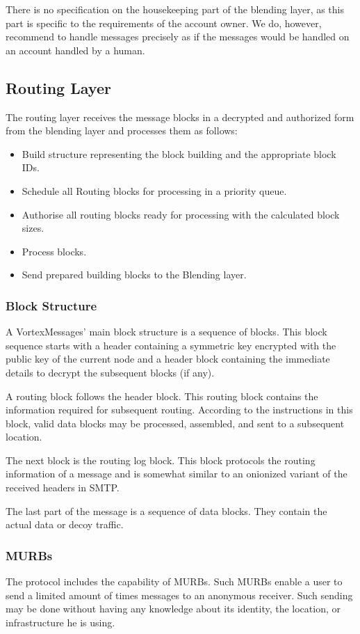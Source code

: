 There is no specification on the housekeeping part of the blending layer, as this part is specific to the requirements of the account owner. We do, however, recommend to handle messages precisely as if the messages would be handled on an account handled by a human. 

\subsection{Routing Layer}
The routing layer receives the message blocks in a decrypted and authorized form from the blending layer and processes them as follows:

\begin{itemize}
	\item Build structure representing the block building and the appropriate block IDs.
	\item Schedule all Routing blocks for processing in a priority queue.
	\item Authorise all routing blocks ready for processing with the calculated block sizes.
	\item Process blocks.
	\item Send prepared building blocks to the Blending layer.
\end{itemize}

\subsubsection{Block Structure}
A VortexMessages' main block structure is a sequence of blocks. This block sequence starts with a header containing a symmetric key encrypted with the public key of the current node and a header block containing the immediate details to decrypt the subsequent blocks (if any).

A routing block follows the header block. This routing block contains the information required for subsequent routing. According to the instructions in this block, valid data blocks may be processed, assembled, and sent to a subsequent location. 

The next block is the routing log block. This block protocols the routing information of a message and is somewhat similar to an onionized variant of the received headers in SMTP.

The last part of the message is a sequence of data blocks. They contain the actual data or decoy traffic.

\subsubsection{MURBs\label{sec:murb}}
The protocol includes the capability of MURBs. Such MURBs enable a user to send a limited amount of times messages to an anonymous receiver. Such sending may be done without having any knowledge about its identity, the location, or infrastructure he is using.

